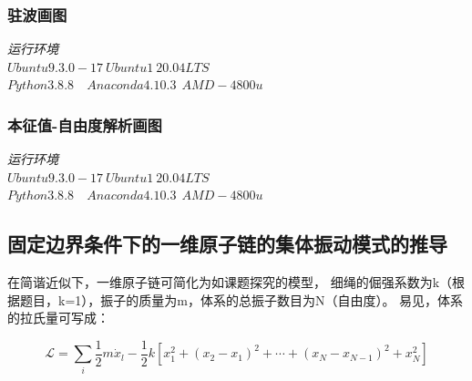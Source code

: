 \documentclass[11pt, a4paper, oneside]{ctexart}
\begin{document}
{{{\begin{appendices}
{\begin{flushright}
                \end{flushright}
            
                }
                \subsubsection{驻波画图}
            {    \begin{flushright}
                \scriptsize\emph{运行环境\\$Ubuntu 9.3.0-17\ Ubuntu1~20.04LTS$}\\
                \scriptsize\emph{$Python 3.8.8$\ \ $Anaconda 4.10.3\ \  AMD-4800u$}
                    
                \end{flushright}
            
                }
                \subsubsection{本征值-自由度解析画图}
                {    \begin{flushright}
                    \scriptsize\emph{运行环境\\$Ubuntu 9.3.0-17\ Ubuntu1~20.04LTS$}\\
                    \scriptsize\emph{$Python 3.8.8$\ \ $Anaconda 4.10.3\ \  AMD-4800u$}
                        
                    \end{flushright}
                
                    }

    \renewcommand{\thesection}{\Alph{section}}
    \subsection{固定边界条件下的一维原子链的集体振动模式的推导}
{
    在简谐近似下，一维原子链可简化为如课题探究的模型，
    细绳的倔强系数为k（根据题目，k=1），振子的质量为m，体系的总振子数目为N（自由度）。
易见，体系的拉氏量可写成：

\begin{equation}
    \mathscr{L}=\sum_{i} \frac{1}{2} m \dot{x}_{l}-\frac{1}{2} k\left[x_{1}^{2}+\left(x_{2}-x_{1}\right)^{2}+\cdots+\left(x_{N}-x_{N-1}\right)^{2}+x_{N}^{2}\right]
    \end{equation}

}
\end{appendices}}}}
\end{document}
